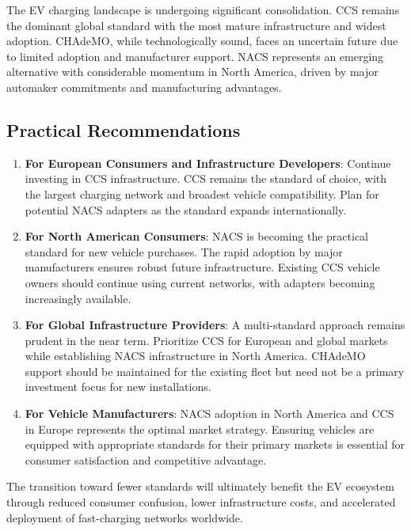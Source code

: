 \documentclass[12pt]{article}
\begin{document}
The EV charging landscape is undergoing significant consolidation. CCS remains the dominant global standard with the most mature infrastructure and widest adoption. CHAdeMO, while technologically sound, faces an uncertain future due to limited adoption and manufacturer support. NACS represents an emerging alternative with considerable momentum in North America, driven by major automaker commitments and manufacturing advantages.

\subsection{Practical Recommendations}

\begin{enumerate}
    \item \textbf{For European Consumers and Infrastructure Developers}: Continue investing in CCS infrastructure. CCS remains the standard of choice, with the largest charging network and broadest vehicle compatibility. Plan for potential NACS adapters as the standard expands internationally.
    
    \item \textbf{For North American Consumers}: NACS is becoming the practical standard for new vehicle purchases. The rapid adoption by major manufacturers ensures robust future infrastructure. Existing CCS vehicle owners should continue using current networks, with adapters becoming increasingly available.
    
    \item \textbf{For Global Infrastructure Providers}: A multi-standard approach remains prudent in the near term. Prioritize CCS for European and global markets while establishing NACS infrastructure in North America. CHAdeMO support should be maintained for the existing fleet but need not be a primary investment focus for new installations.
    
    \item \textbf{For Vehicle Manufacturers}: NACS adoption in North America and CCS in Europe represents the optimal market strategy. Ensuring vehicles are equipped with appropriate standards for their primary markets is essential for consumer satisfaction and competitive advantage.
\end{enumerate}

The transition toward fewer standards will ultimately benefit the EV ecosystem through reduced consumer confusion, lower infrastructure costs, and accelerated deployment of fast-charging networks worldwide.
\end{document}
